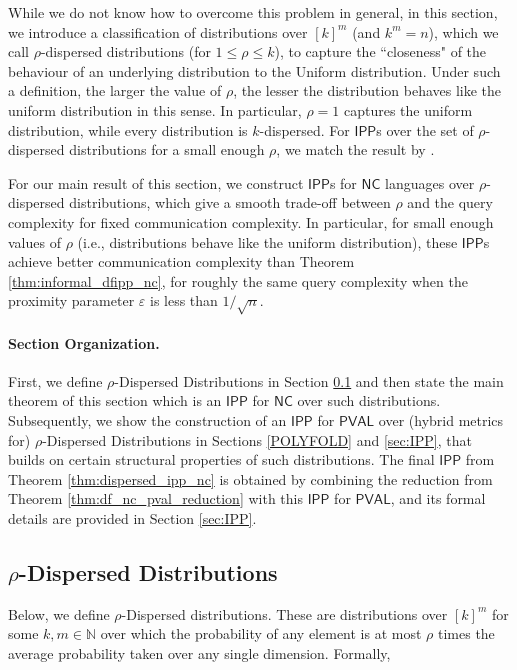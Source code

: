 \documentclass[10pt,a4paper]{article}
\newcommand{\NC}{\mathsf{NC}}
\newcommand{\PVAL}{\mathsf{PVAL}}
\newcommand{\IPP}{\mathsf{IPP}}
\newcommand{\N}{\mathbb{N}}
\begin{document}
While we do not know how to overcome this problem in general, in this section, we introduce a classification of distributions over $[k]^m$ (and $k^m = n$), which we call $\rho$-dispersed distributions (for $1 \leq \rho \leq k$), to capture the ``closeness" of the behaviour of an underlying distribution to the Uniform distribution. Under such a definition, the larger the value of $\rho$, the lesser the distribution behaves like the uniform distribution in this sense. In particular, $\rho = 1$ captures the uniform distribution, while every distribution is $k$-dispersed. For $\IPP$s over the set of $\rho$-dispersed distributions for a small enough $\rho$, we match the result by \cite{RVW}. 

For our main result of this section, we construct $\IPP$s for $\NC$ languages over $\rho$-dispersed distributions, which give a smooth trade-off between $\rho$ and the query complexity for fixed communication complexity. In particular, for small enough values of $\rho$ (i.e., distributions behave like the uniform distribution), these $\IPP$s achieve better communication complexity than Theorem \ref{thm:informal_dfipp_nc}, for roughly the same query complexity when the proximity parameter $\varepsilon $ is less than $1/\sqrt{n}$.

\paragraph{Section Organization.} 
First, we define $\rho$-Dispersed Distributions in Section \ref{sec:def_dispersed} and then  state the main theorem of this section which is an $\IPP$ for $\NC$ over such distributions. Subsequently, we show the construction of an $\IPP$ for $\PVAL$ over (hybrid metrics for) $\rho$-Dispersed Distributions in Sections \ref{POLYFOLD} and \ref{sec:IPP}, that builds on certain structural properties of such distributions. The final $\IPP$ from Theorem \ref{thm:dispersed_ipp_nc} is obtained by combining the reduction from Theorem \ref{thm:df_nc_pval_reduction} with this $\IPP$ for $\PVAL$, and its formal details are provided in Section \ref{sec:IPP}.

\subsection{$\rho$-Dispersed Distributions}
\label{sec:def_dispersed}
Below, we define $\rho$-Dispersed distributions. These are distributions over $[k]^{m}$ for some $k,m\in \N$ over which the probability of any element is at most $\rho$ times the average probability taken over any single dimension. Formally,
\end{document}
